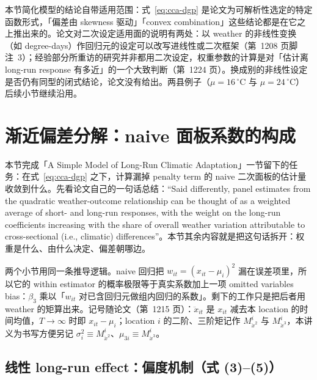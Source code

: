 本节简化模型的结论自带适用范围：式~\ref{eq:cca-dgp} 是论文为可解析性选定的特定函数形式，「偏差由 skewness 驱动」「convex combination」这些结论都是在它之上推出来的。论文对二次设定适用面的说明有两处：以 weather 的非线性变换（如 degree-days）作回归元的设定可以改写进线性或二次框架（第~1208 页脚注~3）；经验部分所重访的研究并非都用二次设定，权重参数的计算是对「估计离 long-run response 有多近」的一个大致判断（第~1224 页）。换成别的非线性设定是否仍有同型的闭式结论，论文没有给出。两县例子（$\mu=16\,^\circ$C 与 $\mu=24\,^\circ$C）后续小节继续沿用。

\section{渐近偏差分解：naive 面板系数的构成}
\label{sec:cca-bias}

本节完成「A Simple Model of Long-Run Climatic Adaptation」一节留下的任务：在式~\ref{eq:cca-dgp} 之下，计算漏掉 penalty term 的 naive 二次面板的估计量收敛到什么。先看论文自己的一句话总结：``Said differently, panel estimates from the quadratic weather-outcome relationship can be thought of as a weighted average of short- and long-run responses, with the weight on the long-run coefficients increasing with the share of overall weather variation attributable to cross-sectional (i.e., climatic) differences''\citep[第~1209 页]{merel2021climate}。本节其余内容就是把这句话拆开：权重是什么、由什么决定、偏差朝哪边。

两个小节用同一条推导逻辑。naive 回归把 $w_{it}=(x_{it}-\mu_i)^2$ 漏在误差项里，所以它的 within estimator 的概率极限等于真实系数加上一项 omitted variables bias：$\beta_3$ 乘以「$w_{it}$ 对已含回归元做组内回归的系数」。剩下的工作只是把后者用 weather 的矩算出来。记号随论文（第~1215 页）：$\ddot{x}_{it}$ 是 $x_{it}$ 减去本 location 的时间均值，$T\to\infty$ 时即 $x_{it}-\mu_i$；location $i$ 的二阶、三阶矩记作 $M^i_{\ddot{x}^2}$ 与 $M^i_{\ddot{x}^3}$，本讲义为书写方便另记 $\sigma_i^2\equiv M^i_{\ddot{x}^2}$、$\mu_{3i}\equiv M^i_{\ddot{x}^3}$。

\subsection{线性 long-run effect：偏度机制（式 (3)--(5)）}


